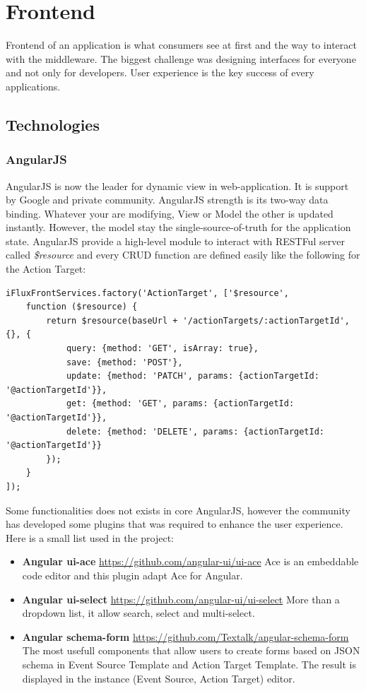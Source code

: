 \section{Frontend}

Frontend of an application is what consumers see at first and the way to interact with the middleware. The biggest challenge was designing interfaces for everyone and not only for developers. User experience is the key success of every applications. 

\subsection{Technologies}


\subsubsection{AngularJS}

AngularJS is now the leader for dynamic view in web-application. It is support by Google and private community. AngularJS strength is its two-way data binding. Whatever your are modifying, View or Model the other is updated instantly. However, the model stay the single-source-of-truth for the application state. AngularJS provide a high-level module to interact with RESTFul server called \emph{\$resource} and every CRUD function are defined easily like the following for the Action Target:

\begin{lstlisting}
iFluxFrontServices.factory('ActionTarget', ['$resource',
    function ($resource) {
        return $resource(baseUrl + '/actionTargets/:actionTargetId', {}, {
            query: {method: 'GET', isArray: true},
            save: {method: 'POST'},
            update: {method: 'PATCH', params: {actionTargetId: '@actionTargetId'}},
            get: {method: 'GET', params: {actionTargetId: '@actionTargetId'}},
            delete: {method: 'DELETE', params: {actionTargetId: '@actionTargetId'}}
        });
    }
]);
\end{lstlisting}

Some functionalities does not exists in core AngularJS, however the community has developed some plugins that was required to enhance the user experience. Here is a small list used in the project:
\begin{itemize}
  \item \textbf{Angular ui-ace} \url{https://github.com/angular-ui/ui-ace} Ace is an embeddable code editor and this plugin adapt Ace for Angular.
  \item \textbf{Angular ui-select} \url{https://github.com/angular-ui/ui-select} More than a dropdown list, it allow search, select and multi-select. 
  \item \textbf{Angular schema-form} \url{https://github.com/Textalk/angular-schema-form} The most usefull components that allow users to create forms based on JSON schema in Event Source Template and Action Target Template. The result is displayed in the instance (Event Source, Action Target) editor.    
\end{itemize}

